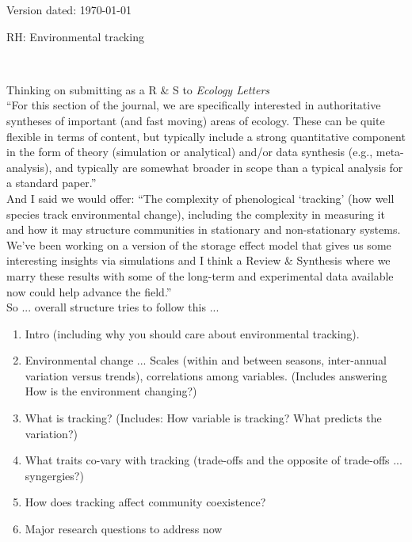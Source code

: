 \documentclass[11pt,letterpaper]{article}
\begin{document}
\begin{flushright}
Version dated: \today
\end{flushright}
\bigskip
\noindent RH: Environmental tracking 
\bigskip
\medskip
\begin{center}
\\
\end{center}


Thinking on submitting as a R \& S to \emph{Ecology Letters}\\
``For this section of the journal, we are specifically interested in authoritative syntheses of important (and fast moving) areas of ecology.  These can be quite flexible in terms of content, but typically include a strong quantitative component in the form of theory (simulation or analytical) and/or data synthesis (e.g., meta-analysis), and typically are somewhat broader in scope than a typical analysis for a standard paper.''\\

And I said we would offer: ``The complexity of phenological `tracking' (how well species track environmental change), including the complexity in measuring it and how it may structure communities in stationary and non-stationary systems. We've been working on a version of the storage effect model that gives us some interesting insights via simulations and I think a Review \& Synthesis where we marry these results with some of the long-term and experimental data available now could help advance the field.''\\

So ... overall structure tries to follow this ...
\begin{enumerate}
\item Intro (including why you should care about environmental tracking).
\item Environmental change ... Scales (within and between seasons, inter-annual variation versus trends), correlations among variables. (Includes answering How is the environment changing?)
\item What is tracking? (Includes: How variable is tracking? What predicts the variation?)
\item What traits co-vary with tracking (trade-offs and the opposite of trade-offs ... syngergies?)
\item How does tracking affect community coexistence?
\item Major research questions to address now
\end{enumerate}
\end{document}
